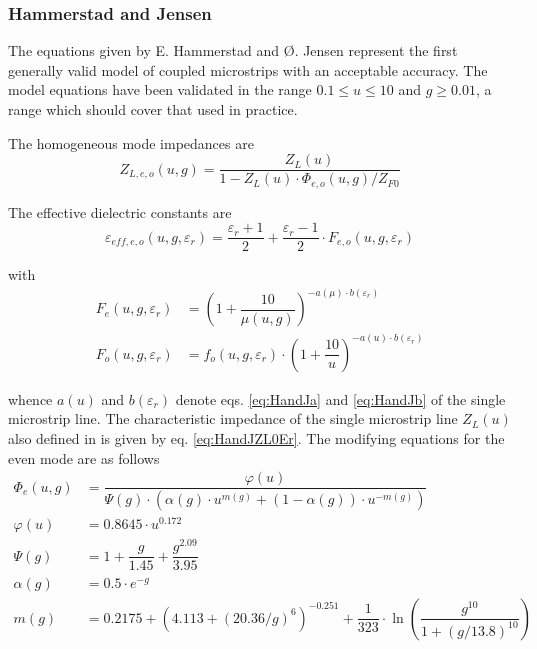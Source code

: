 \documentclass[10pt]{report}
\begin{document}
\subsubsection{Hammerstad and Jensen}

The equations given by E. Hammerstad and {\O}. Jensen
\cite{Hammerstad} represent the first generally valid model of coupled
microstrips with an acceptable accuracy.  The model equations have
been validated in the range $0.1 \le u \le 10$ and $g \ge 0.01$, a
range which should cover that used in practice.

\addvspace{12pt}

The homogeneous mode impedances are
\begin{equation}
\label{eq:HandJZLeo}
Z_{L,e,o}\left(u, g\right) = \dfrac{Z_{L}(u)}{1 - Z_{L}(u)\cdot \Phi_{e,o}\left(u,g\right) / Z_{F0}}
\end{equation}

The effective dielectric constants are
\begin{equation}
\varepsilon_{eff,e,o}\left(u,g,\varepsilon_r\right) = \dfrac{\varepsilon_r+1}{2} + \dfrac{\varepsilon_r-1}{2}\cdot F_{e,o}\left(u,g,\varepsilon_r\right)
\end{equation}

with
\begin{align}
F_{e}\left(u,g,\varepsilon_r\right) &= \left(1+\dfrac{10}{\mu\left(u,g\right)}\right)^{-a(\mu)\cdot b\left(\varepsilon_r\right)}\\
F_{o}\left(u,g,\varepsilon_r\right) &= f_o\left(u,g,\varepsilon_r\right)\cdot \left(1+\dfrac{10}{u}\right)^{-a\left(u\right)\cdot b\left(\varepsilon_r\right)}
\end{align}

whence $a(u)$ and $b\left(\varepsilon_r\right)$ denote
eqs. \eqref{eq:HandJa} and \eqref{eq:HandJb} of the single microstrip
line.  The characteristic impedance of the single microstrip line
$Z_L\left(u\right)$ also defined in \cite{Hammerstad} is given by
eq. \eqref{eq:HandJZL0Er}.  The modifying equations for the even mode
are as follows
\begin{align}
\Phi_e\left(u,g\right) &= \dfrac{\varphi(u)}{\Psi(g)\cdot \left(\alpha(g)\cdot u^{m(g)} +\left(1-\alpha(g)\right)\cdot u^{-m(g)}\right)}\\
\varphi(u) &= 0.8645\cdot u^{0.172}\\
\Psi(g) &= 1 + \dfrac{g}{1.45} + \dfrac{g^{2.09}}{3.95}\\
\alpha(g) &= 0.5\cdot e^{-g}\\
m(g) &= 0.2175+\left(4.113+\left(20.36/g\right)^6\right)^{-0.251} +\dfrac{1}{323}\cdot\ln{\left(\dfrac{g^{10}}{1+\left(g/13.8\right)^{10}}\right)}
\end{align}
\end{document}
